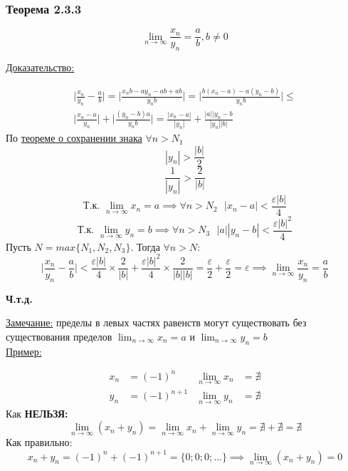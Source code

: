 \documentclass[12pt]{article}
\begin{document}
    \subsubsection*{Теорема 2.3.3}\label{th:2.3.3}
    \[ \lim_{n\to\infty}\frac{x_n}{y_n} = \frac{a}{b}, b \ne 0 \]\par\noindent
    \underline{Доказательство:}\par
    \begin{adjustwidth}{1.5em}{1.5em}
        \begin{gather*}
            \Big|\frac{x_n}{y_n} - \frac{a}{b}\Big| = \Big|\frac{x_nb-ay_n-ab+ab}{y_nb}\Big| = \Big|\frac{b(x_n-a)-a(y_n-b)}{y_nb}\Big| \le\\
            \Big|\frac{x_n-a}{y_n}\Big| + \Big|\frac{(y_n-b)a}{y_nb}\Big| = \frac{|x_n-a|}{|y_n|}+\frac{|a||y_n-b}{|y_n||b|}
        \end{gather*}
        По \hyperref[th:2.2.3]{теореме о сохранении знака} $\forall n > N_{1}$
        \[|y_n| > \frac{|b|}{2}\]
        \[\frac{1}{|y_n|} > \frac{2}{|b|}\]
        \[\text{Т.к. }\lim_{n\to\infty}x_n = a \implies \forall n > N_{2} \text{ } |x_n - a| < \frac{\varepsilon|b|}{4}\]
        \[\text{Т.к. }\lim_{n\to\infty}y_n = b \implies \forall n > N_{3} \text{ } |a||y_n - b| < \frac{\varepsilon|b|^{2}}{4}\]
        Пусть $N = max\{N_{1}, N_{2}, N_{3}\}$. Тогда $\forall n > N$:
        \[ \Big|\frac{x_n}{y_n} - \frac{a}{b}\Big| < \frac{\varepsilon|b|}{4} \times \frac{2}{|b|} + \frac{\varepsilon|b|^{2}}{4} \times \frac{2}{|b||b|} = \frac{\varepsilon}{2} + \frac{\varepsilon}{2} = \varepsilon \implies \lim_{n\to\infty}\frac{x_n}{y_n} = \frac{a}{b} \]
        \begin{center}
            \textbf{Ч.т.д.}
        \end{center}
    \end{adjustwidth}
    \underline{Замечание:} пределы в левых частях равенств могут существовать без существования пределов $\lim_{n\to\infty} x_n = a$ и $\lim_{n\to\infty} y_n = b$\\
    \underline{Пример:}
    \begin{adjustwidth}{1.5em}{1.5em}
        \begin{align*}
            x_n &= (-1)^n & \lim_{n\to\infty} x_n &= \nexists\\
            y_n &= (-1)^{n+1} & \lim_{n\to\infty} y_n &= \nexists
        \end{align*}
        Как \textbf{НЕЛЬЗЯ:}
        \[ \lim_{n\to\infty} (x_n + y_n) = \lim_{n\to\infty}x_n + \lim_{n\to\infty}y_n = \nexists + \nexists = \nexists \]
        Как правильно:
        \[ x_n + y_n = (-1)^n + (-1)^{n+1} = \{0;0;0;\dots\} \implies \lim_{n\to\infty}(x_n+y_n) = 0 \]
    \end{adjustwidth}
\end{document}
